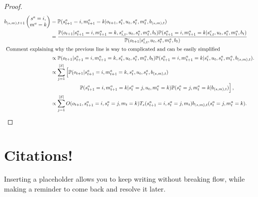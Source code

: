 \documentclass{article}
\begin{document}
\begin{proof}
\begin{align}
     b_{(s,m),t+1}\left(\begin{matrix}
        s^a = i, \\ m^a = k
    \end{matrix} \right) &= \mathbb{P}( s_{t+1}^a = i, m_{t+1}^a = k | o_{t+1}, s_{t}^e, u_{t}, s_t^a, m_t^a, b_{(s,m),t} ) \\
    &= \frac{\mathbb{P}( o_{t+1} | s_{t+1}^a = i, m_{t+1}^a = k, s_{i,t}^e, u_{t},  s_t^a, m_t^a, b_{t} ) \mathbb{P}( s_{t+1}^a = i, m_{t+1}^a = k |  s_{i,t}^e, u_{t},  s_t^a, m_t^a, b_{t} )}{\mathbb{P}(o_{t+1} | s_{i,t}^e, u_{t}, s_t^a, m_t^a, b_{t}   ) } \\
    \shortintertext{ Comment explaining why the previous line is way to complicated and can be easily simplified } 
          &\propto \mathbb{P}( o_{t+1} |  s_{t+1}^a = i, m_{t+1}^a = k, s_t^e, u_{t}, s_t^a, m_t^a, b_{t} ) \mathbb{P}( s_{t+1}^a = i, m_{t+1}^a = k |  s_t^e, u_{t}, s_{t}^a, m_{t}^a, b_{(s,m),t} ).  \\
    &\propto \sum_{j=1}^{|S|} \left[ \mathbb{P}( o_{t+1} |  s_{t+1}^a = i, m_{t+1}^a = k, s_t^e, u_{t}, s_t^a, b_{(s,m),t} ) \right. \nonumber \\ 
    &~~~~~~~~~~~~~~~~\left. \mathbb{P}( s_{t+1}^a = i, m_{t+1}^a = k | s_{t}^a=j, u_{t}, m_t^a = k ) \mathbb{P}( s_{t}^a = j, m_{t}^a = k |  b_{(s,m),t} ) \right],   \\
    &\propto  \sum_{j=1}^{|S|} O(o_{t+1},s_{t+1}^a=i,s_t^a=j,m_t=k) T_s(s_{t+1}^a=i, s_{t}^a=j, m_t ) b_{(s,m),t}(s_t^a = j, m_{t}^a = k).
\end{align}
 
\end{proof}

\newpage
\section{Citations!}

Inserting a placeholder allows you to keep writing without breaking flow, while making a reminder to come back and resolve it later.
\end{document}
